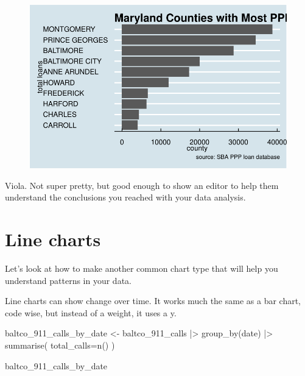 \documentclass[
  letterpaper,
  DIV=11,
  numbers=noendperiod]{scrreprt}
\newenvironment{Shaded}{\begin{snugshade}}{\end{snugshade}}
\newcommand{\AttributeTok}[1]{\textcolor[rgb]{0.40,0.45,0.13}{#1}}
\newcommand{\FunctionTok}[1]{\textcolor[rgb]{0.28,0.35,0.67}{#1}}
\newcommand{\NormalTok}[1]{\textcolor[rgb]{0.00,0.23,0.31}{#1}}
\newcommand{\OtherTok}[1]{\textcolor[rgb]{0.00,0.23,0.31}{#1}}
\newcommand{\SpecialCharTok}[1]{\textcolor[rgb]{0.37,0.37,0.37}{#1}}
\begin{document}
\begin{figure}[H]

{\centering \includegraphics{./visualizing-for-reporting_files/figure-pdf/unnamed-chunk-11-1.pdf}

}

\end{figure}

Viola. Not super pretty, but good enough to show an editor to help them
understand the conclusions you reached with your data analysis.

\hypertarget{line-charts}{%
\section{Line charts}\label{line-charts}}

Let's look at how to make another common chart type that will help you
understand patterns in your data.

Line charts can show change over time. It works much the same as a bar
chart, code wise, but instead of a weight, it uses a y.

\begin{Shaded}
\begin{Highlighting}[]
\NormalTok{baltco\_911\_calls\_by\_date }\OtherTok{\textless{}{-}}\NormalTok{ baltco\_911\_calls }\SpecialCharTok{|\textgreater{}}
  \FunctionTok{group\_by}\NormalTok{(date) }\SpecialCharTok{|\textgreater{}}
  \FunctionTok{summarise}\NormalTok{(}
    \AttributeTok{total\_calls=}\FunctionTok{n}\NormalTok{()}
\NormalTok{  )}

\NormalTok{baltco\_911\_calls\_by\_date}
\end{Highlighting}
\end{Shaded}
\end{document}
